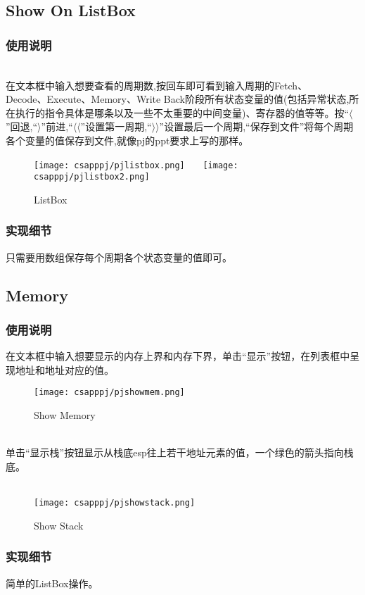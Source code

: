 \documentclass{article}
\begin{document}
\begin{spacing}{1.5}
\subsection{Show On ListBox}
\subsubsection{使用说明}
\noindent
{}
\setlength{\hangindent}{3.5em}\\
在文本框中输入想要查看的周期数,按回车即可看到输入周期的Fetch、\\
Decode、Execute、Memory、Write Back阶段所有状态变量的值(包括异常状态,所在执行的指令具体是哪条以及一些不太重要的中间变量)、寄存器的值等等。按“$\langle $”回退,“$\rangle $”前进,“$\langle \langle$”设置第一周期,“$\rangle \rangle$”设置最后一个周期,“保存到文件”将每个周期各个变量的值保存到文件,就像pj的ppt要求上写的那样。
\begin{figure}[htbp]
\centering
\texttt{[image: csapppj/pjlistbox.png]}
\ \ \
\texttt{[image: csapppj/pjlistbox2.png]}
\caption{ListBox}
\end{figure}
\subsubsection{实现细节}
\noindent
{}
\setlength{\hangindent}{2.8em}
只需要用数组保存每个周期各个状态变量的值即可。
\subsection{Memory}
\subsubsection{使用说明}
\noindent
{}
\setlength{\hangindent}{2.8em}
在文本框中输入想要显示的内存上界和内存下界，单击“显示”按钮，在列表框中呈现地址和地址对应的值。
\begin{figure}[htbp]
\centering
\texttt{[image: csapppj/pjshowmem.png]}
\caption{Show Memory}
\end{figure}\\
单击“显示栈”按钮显示从栈底esp往上若干地址元素的值，一个绿色的箭头指向栈底。\\\\
\begin{figure}[htbp]
\centering
\texttt{[image: csapppj/pjshowstack.png]}
\caption{Show Stack}
\end{figure}
\subsubsection{实现细节}
\noindent
{}
\setlength{\hangindent}{3.5em}
简单的ListBox操作。

\end{spacing}
\end{document}
